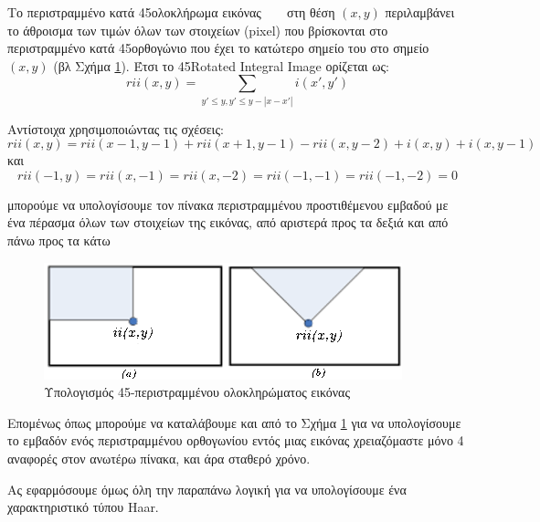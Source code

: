 Το περιστραμμένο κατά 45\degree ολοκλήρωμα  εικόνας ~\cite{Lienhart02anextended}
~\cite{Lienhart2003} στη θέση $(x,y)$ περιλαμβάνει
το άθροισμα των τιμών όλων των στοιχείων (pixel) που βρίσκονται στο περιστραμμένο
κατά 45\degree ορθογώνιο που έχει το κατώτερο σημείο του στο σημείο $(x,y)$
(βλ Σχήμα \ref{fig:rotintegrimg}). Έτσι το 45\degree Rotated Integral Image ορίζεται ως:
$$
rii(x,y) = \displaystyle\sum_{y'\leq y, y'\leq y-|x-x'|} i(x',y')
$$

Αντίστοιχα χρησιμοποιώντας τις σχέσεις:
$$
rii(x,y) = rii(x-1,y-1) + rii(x+1,y-1) - rii(x,y-2) + i(x,y) + i(x,y-1)
$$
και
$$
rii(-1,y)=rii(x,-1)=rii(x,-2)=rii(-1,-1)=rii(-1,-2)=0
$$

μπορούμε να υπολογίσουμε τον πίνακα περιστραμμένου προστιθέμενου εμβαδού με ένα
πέρασμα όλων των στοιχείων της εικόνας, από αριστερά προς τα δεξιά και από πάνω
προς τα κάτω

\begin{figure}[htbp]
  \begin{center}
    \includegraphics[width=0.8\maxwidth]{../figures/rotintegrimg2.png}
    \caption{Υπολογισμός 45\degree-περιστραμμένου ολοκληρώματος εικόνας\label{fig:rotintegrimg}}
   \end{center}
\end{figure}

Επομένως όπως μπορούμε να καταλάβουμε και από το Σχήμα \ref{fig:rotintegrimg}
 για να υπολογίσουμε το εμβαδόν ενός περιστραμμένου ορθογωνίου εντός μιας εικόνας
 χρειαζόμαστε μόνο 4 αναφορές στον ανωτέρω πίνακα, και άρα σταθερό χρόνο.

Ας εφαρμόσουμε όμως όλη την παραπάνω λογική για να υπολογίσουμε ένα χαρακτηριστικό
τύπου Haar.


